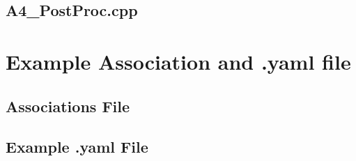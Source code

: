 \documentclass[a4paper, 12pt]{article}
\begin{document}
\subsection{A4\_PostProc.cpp} \label{subsec:PostProc.cpp}


\newpage
\section{Example Association and .yaml file}\label{sec:ExAsYaml}

\subsection{Associations File} \label{subsec:ExAssoc}


\subsection{Example .yaml File} \label{subsec:ExYaml}

\end{document}
